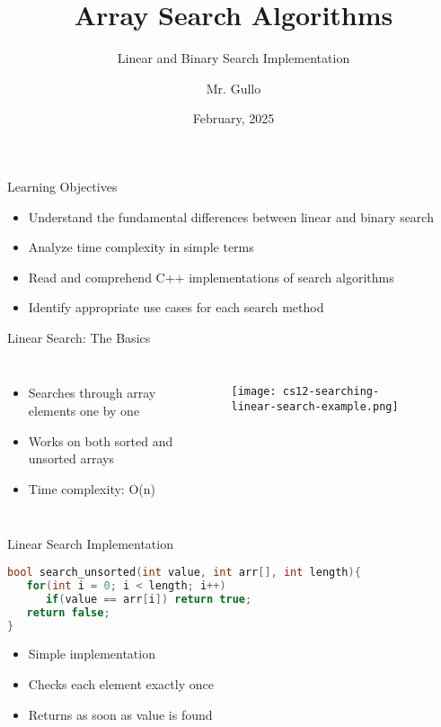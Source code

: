 \documentclass{beamer}
\title[Array Searching]{ Array Search Algorithms}
\subtitle{Linear and Binary Search Implementation}
\author[Mr. Gullo]{Mr. Gullo}
\date[Feb 2025]{February, 2025}
\begin{document}
\frame{\titlepage}

\begin{frame}{Learning Objectives}
\begin{itemize}
\item Understand the fundamental differences between linear and binary search
\item Analyze time complexity in simple terms
\item Read and comprehend C++ implementations of search algorithms
\item Identify appropriate use cases for each search method
\end{itemize}
\end{frame}

\begin{frame}{Linear Search: The Basics}
\begin{columns}
\begin{itemize}
\item Searches through array elements one by one
\item Works on both sorted and unsorted arrays
\item Time complexity: O(n)
\end{itemize}

\begin{figure}
    \centering
    \texttt{[image: cs12-searching-linear-search-example.png]}
\end{figure}
\end{columns}
\end{frame}

\begin{frame}[fragile]{Linear Search Implementation}
\begin{lstlisting}[language=C++]
bool search_unsorted(int value, int arr[], int length){
   for(int i = 0; i < length; i++)
      if(value == arr[i]) return true;
   return false;
}
\end{lstlisting}
\pause

\begin{itemize}
\item Simple implementation
\item Checks each element exactly once
\item Returns as soon as value is found
\end{itemize}
\end{frame}
\end{document}
